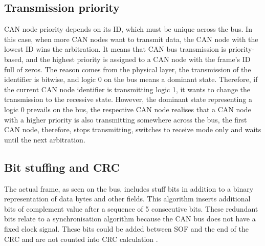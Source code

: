 \documentclass{ctuthesis}
\begin{document}
  \subsection{Transmission priority}
   CAN node priority depends on its ID, which must be unique across the bus. In this case, when more CAN nodes want to transmit data, the CAN node with the lowest ID wins the arbitration. It means that CAN bus transmission is priority-based, and the highest priority is assigned to a CAN node with the frame's ID full of zeros. The reason comes from the physical layer, the transmission of the identifier is bitwise, and logic 0 on the bus means a dominant state. Therefore, if the current CAN node identifier is transmitting logic 1, it wants to change the transmission to the recessive state. However, the dominant state representing a logic 0 prevails on the bus, the respective CAN node realises that a CAN node with a higher priority is also transmitting somewhere across the bus, the first CAN node, therefore, stops transmitting, switches to receive mode only and waits until the next arbitration.
  \subsection{Bit stuffing and CRC}
   The actual frame, as seen on the bus, includes stuff bits in addition to a binary representation of data bytes and other fields. This algorithm inserts additional bits of complement value after a sequence of 5 consecutive bits. These redundant bits relate to a synchronisation algorithm because the CAN bus does not have a fixed clock signal. These bits could be added between SOF and the end of the CRC and are not counted into CRC calculation \cite{can_crc}.
\end{document}
